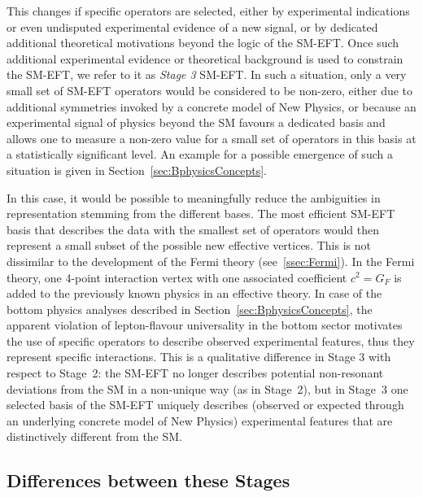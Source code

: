 This changes if specific operators are selected, either by
experimental indications or even undisputed experimental evidence of a
new signal, or by dedicated additional theoretical motivations beyond
the logic of the SM-EFT. Once such additional experimental evidence or
theoretical background is used to constrain the SM-EFT, we refer to it
as \emph{Stage 3} SM-EFT.  In such a situation, only a very small set
of SM-EFT operators would be considered to be non-zero, either due to
additional symmetries invoked by a concrete model of New Physics, or
because an experimental signal of physics beyond the SM favours a
dedicated basis and allows one to measure a non-zero value for a small set
of operators in this basis at a statistically
significant level. An example for a possible emergence of such a
situation is given in Section~\ref{sec:BphysicsConcepts}.

In this case, it would be possible to meaningfully reduce the
ambiguities in representation stemming from the different bases. The
most efficient SM-EFT basis that describes the data with the
smallest set of operators would then represent a small subset of the
possible new effective vertices.  This is not dissimilar to the
development of the Fermi theory (see~\ref{ssec:Fermi}). In the Fermi
theory, one 4-point interaction vertex with one associated coefficient
$c^2=G_F$ is added to the previously known physics in an effective
theory. In case of the bottom physics analyses described in Section~\ref{sec:BphysicsConcepts}, the apparent
violation of lepton-flavour universality in the bottom sector motivates
the use of specific operators to describe observed experimental
features, thus they represent specific interactions. This is a
qualitative difference in Stage 3 with respect to Stage~2: the SM-EFT
no longer describes potential non-resonant deviations from the
SM in a non-unique way (as in Stage~2), but in Stage~3 one selected basis of
the SM-EFT uniquely describes (observed or expected through an
underlying concrete model of New Physics) experimental features that
are distinctively different from the SM.

\subsection{Differences between these Stages}

